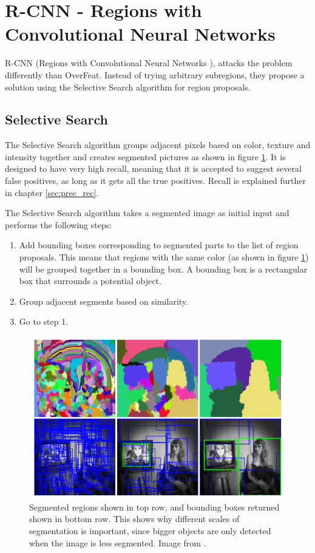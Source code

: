 \section{R-CNN - Regions with Convolutional Neural Networks }
R-CNN (Regions with Convolutional Neural Networks  \citep{R-CNN}), attacks the problem differently than OverFeat. Instead of trying arbitrary subregions, they propose a solution using the Selective Search algorithm for region proposals.

\subsection{Selective Search }
The Selective Search algorithm \citep{SelSearch} groups adjacent pixels based on color, texture and intensity together and creates segmented pictures as shown in figure \ref{fig:sel_serach}. It is designed to have very high recall, meaning that it is accepted to suggest several false positives, as long as it gets all the true positives. Recall is explained further in chapter \ref{sec:prec_rec}.

\vspace{3mm}

The Selective Search algorithm takes a segmented image as initial input and performs the following steps:
\begin{enumerate}
  \item Add bounding boxes corresponding to segmented parts to the list of region proposals. This means that regions with the same color (as shown in figure \ref{fig:sel_serach}) will be grouped together in a bounding box. A bounding box is a rectangular box that surrounds a potential object.
  \item Group adjacent segments based on similarity.
  \item Go to step 1.
\end{enumerate}

\begin{figure}[h!]
    \centering
    \includegraphics[scale=0.5]{fig/sel_search.png}
    \caption{Segmented regions shown in top row, and bounding boxes returned shown in bottom row. This shows why different scales of segmentation is important, since bigger objects are only detected when the image is less segmented. Image from \citep{SelSearch}.}
    \label{fig:sel_serach}
\end{figure}






